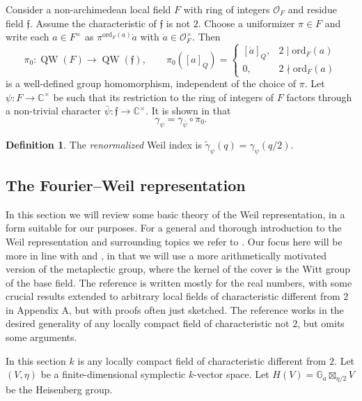 \documentclass{article}
\def\mb#1{\mathbb{#1}}
\def\C{\mathbb{C}}
\def\cO{\mathcal{O}}
\theoremstyle{definition}
\newtheorem{dfn}[thm]{Definition}
\numberwithin{equation}{subsection}
\renewcommand{\-}{\hyp{}}
\DeclareMathOperator{\QW}{QW}
\newcommand{\rf}{\mathfrak{f}}
\begin{document}
\begin{appendices}
Consider a non-archimedean local field $F$ with ring of integers $\cO_F$ and residue field $\rf$. Assume the characteristic of $\rf$ is not $2$. Choose a uniformizer $\pi \in F$ and write each $a \in F^\times$ as $\pi^{\mathrm{ord}_F(a)}\dot a$ with $\dot a \in \cO_F^\times$. Then
\[ \pi_0 : \QW(F) \to \QW(\rf),\qquad \pi_0([a]_Q)=\begin{cases}
	[\dot a]_Q,&2 \mid \mathrm{ord}_F(a)\\
	0,&2 \nmid \mathrm{ord}_F(a)
\end{cases}\]
is a well-defined group homomorphism, independent of the choice of $\pi$. Let $\psi : F \to \C^\times$ be such that its restriction to the ring of integers of $F$ factors through a non-trivial character $\bar\psi : \rf \to \C^\times$. It is shown in \cite[Proposition A.11]{RR93} that 
\[ \gamma_\psi = \gamma_{\bar\psi} \circ \pi_0. \]

\begin{dfn}
	The \emph{renormalized} Weil index is $\tilde\gamma_\psi(q)=\gamma_\psi(q/2)$.
\end{dfn}







\subsection{The Fourier--Weil representation} \label{sub:fwh}

In this section we will review some basic theory of the Weil representation, in a form suitable for our purposes. For a general and thorough introduction to the Weil representation and surrounding topics we refer to \cite{GanKudlaTakedaTheta}. Our focus here will be more in line with \cite{LionVergne} and \cite{Thomas2013}, in that we will use a more arithmetically motivated version of the metaplectic group, where the kernel of the cover is the Witt group of the base field. The reference \cite{LionVergne} is written mostly for the real numbers, with some crucial results extended to arbitrary local fields of characteristic different from $2$ in Appendix A, but with proofs often just sketched. The reference \cite{Thomas2013} works in the desired generality of any locally compact field of characteristic not $2$, but omits some arguments.
 
In this section $k$ is any locally compact field of characteristic different from $2$. Let $(V,\eta)$ be a finite-dimensional symplectic $k$-vector space. Let  $H(V)=\mb{G}_a \boxtimes_{\eta/2} V$ be the Heisenberg group.



\end{appendices}
\end{document}
